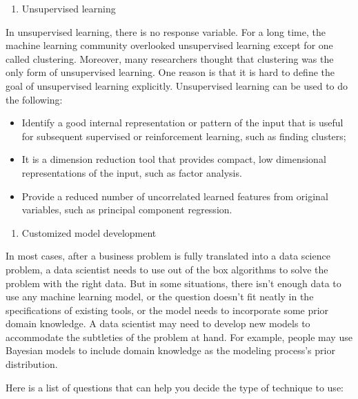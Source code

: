 \documentclass[12pt,]{krantz}
\providecommand{\tightlist}{%
  \setlength{\itemsep}{0pt}\setlength{\parskip}{0pt}}
\begin{document}
\begin{enumerate}
\def\labelenumi{(\arabic{enumi})}
\setcounter{enumi}{1}
\tightlist
\item
  Unsupervised learning
\end{enumerate}

In unsupervised learning, there is no response variable. For a long time, the machine learning community overlooked unsupervised learning except for one called clustering. Moreover, many researchers thought that clustering was the only form of unsupervised learning. One reason is that it is hard to define the goal of unsupervised learning explicitly. Unsupervised learning can be used to do the following:

\begin{itemize}
\item
  Identify a good internal representation or pattern of the input that is useful for subsequent supervised or reinforcement learning, such as finding clusters;
\item
  It is a dimension reduction tool that provides compact, low dimensional representations of the input, such as factor analysis.
\item
  Provide a reduced number of uncorrelated learned features from original variables, such as principal component regression.
\end{itemize}

\begin{enumerate}
\def\labelenumi{(\arabic{enumi})}
\setcounter{enumi}{2}
\tightlist
\item
  Customized model development
\end{enumerate}

In most cases, after a business problem is fully translated into a data science problem, a data scientist needs to use out of the box algorithms to solve the problem with the right data. But in some situations, there isn't enough data to use any machine learning model, or the question doesn't fit neatly in the specifications of existing tools, or the model needs to incorporate some prior domain knowledge. A data scientist may need to develop new models to accommodate the subtleties of the problem at hand. For example, people may use Bayesian models to include domain knowledge as the modeling process's prior distribution.

Here is a list of questions that can help you decide the type of technique to use:
\end{document}

